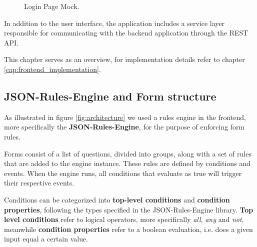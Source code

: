 \begin{figure}[h]
	\begin{center}
	\end{center}
	\caption{Login Page Mock.}\label{fig:login}
\end{figure}

In addition to the user interface, the application includes a service layer responsible for communicating with the backend application through the REST API.

This chapter serves as an overview, for implementation details refer to chapter \ref{cap:frontend_implementation}.

\subsection{JSON-Rules-Engine and Form structure}\label{arc_jre}

As illustrated in figure \ref{fig:architecture} we used a rules engine in the frontend, more specifically the \textbf{JSON-Rules-Engine}\cite{JSON-Rules-Engine}, for the purpose of enforcing form rules.

Forms consist of a list of questions, divided into groups, along with a set of rules that are added to the engine instance. These rules are defined by conditions and events. When the engine runs, all conditions that evaluate as true will trigger their respective events.

Conditions can be categorized into \textbf{top-level conditions} and \textbf{condition properties}, following the types specified in the JSON-Rules-Engine library. 
\textbf{Top level conditions} refer to logical operators, more specifically \textit{all}, \textit{any} and \textit{not}, meanwhile \textbf{condition properties} refer to a boolean evaluation, i.e. does a given input equal a certain value.

